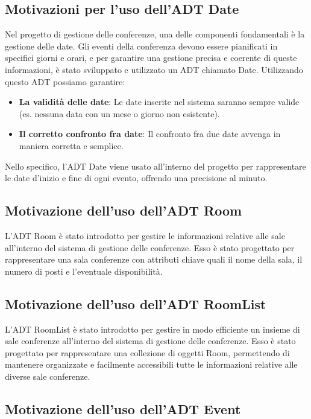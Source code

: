 \documentclass[11pt]{scrartcl} %
\begin{document}
\subsection{Motivazioni per l'uso dell'ADT Date}


Nel progetto di gestione delle conferenze, una delle componenti fondamentali è la gestione delle date. Gli eventi della conferenza devono essere pianificati in specifici giorni e orari, e per garantire una gestione precisa e coerente di queste informazioni, è stato sviluppato e utilizzato un ADT chiamato Date. Utilizzando questo ADT possiamo garantire:
\begin{itemize}
	\item  \textbf{La validità delle date}:  Le date inserite nel sistema saranno sempre valide (es. nessuna data con un mese o giorno non esistente).
	\item \textbf{Il corretto confronto fra date}: Il confronto fra due date avvenga in maniera corretta e semplice.
\end{itemize}
Nello specifico, l'ADT Date viene usato all'interno del progetto per rappresentare le date d'inizio e fine di ogni evento, offrendo una precisione al minuto.

\subsection{Motivazione dell'uso dell'ADT Room}


L'ADT Room è stato introdotto per gestire le informazioni relative alle sale all'interno del sistema di gestione delle conferenze. Esso è stato progettato per rappresentare una sala conferenze con attributi chiave quali il nome della sala, il numero di posti e l'eventuale disponibilità.



\subsection{Motivazione dell'uso dell'ADT RoomList}

L'ADT RoomList è stato introdotto per gestire in modo efficiente un insieme di sale conferenze all'interno del sistema di gestione delle conferenze. Esso è stato progettato per rappresentare una collezione di oggetti Room, permettendo di mantenere organizzate e facilmente accessibili tutte le informazioni relative alle diverse sale conferenze.

\subsection{Motivazione dell'uso dell'ADT Event}
\end{document}
